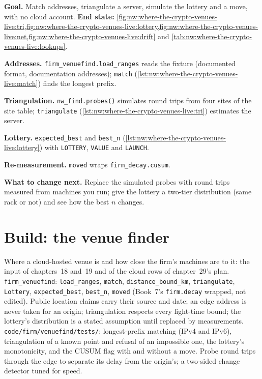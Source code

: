 \begin{tutorial}
\textbf{Goal.} Match addresses, triangulate a server, simulate the lottery and a move, with no cloud account.
\textbf{End state:} \cref{fig:nw:where-the-crypto-venues-live:tri,fig:nw:where-the-crypto-venues-live:lottery,fig:nw:where-the-crypto-venues-live:net,fig:nw:where-the-crypto-venues-live:drift}
and \cref{tab:nw:where-the-crypto-venues-live:lookups}.
\begin{tutsteps}
\item \textbf{Addresses.} \texttt{firm\_venuefind.load\_ranges} reads the fixture (documented format, documentation addresses); \texttt{match}
  (\cref{lst:nw:where-the-crypto-venues-live:match}) finds the longest prefix.
\item \textbf{Triangulation.} \texttt{nw\_find.probes()} simulates round trips from four sites of the site table; \texttt{triangulate}
  (\cref{lst:nw:where-the-crypto-venues-live:tri}) estimates the server.
\item \textbf{Lottery.} \texttt{expected\_best} and \texttt{best\_n} (\cref{lst:nw:where-the-crypto-venues-live:lottery}) with \texttt{LOTTERY},
  \texttt{VALUE} and \texttt{LAUNCH}.
\item \textbf{Re-measurement.} \texttt{moved} wraps \texttt{firm\_decay.cusum}.
\end{tutsteps}
\textbf{What to change next.} Replace the simulated probes with round trips measured from machines you run; give the lottery a two-tier
distribution (same rack or not) and see how the best $n$ changes.
\end{tutorial}

\section{Build: the venue finder}\label{bld:nw:where-the-crypto-venues-live:venuefind}

\begin{build}
 Where a cloud-hosted venue is and how close the firm's machines are to it: the input of chapters~18 and~19 and of the cloud rows of
chapter~29's plan.
 \texttt{firm\_venuefind}: \texttt{load\_ranges}, \texttt{match}, \texttt{distance\_bound\_km}, \texttt{triangulate},
\texttt{Lottery}, \texttt{expected\_best}, \texttt{best\_n}, \texttt{moved} (Book~7's \texttt{firm.decay} wrapped, not edited).
 Public location claims carry their source and date; an edge address is never taken for an origin; triangulation respects every
light-time bound; the lottery's distribution is a stated assumption until replaced by measurements.
 \texttt{code/firm/venuefind/tests/}: longest-prefix matching (IPv4 and IPv6), triangulation of a known point and refusal of an
impossible one, the lottery's monotonicity, and the CUSUM flag with and without a move.
 Probe round trips through the edge to separate its delay from the origin's; a two-sided change detector tuned for speed.
\end{build}

